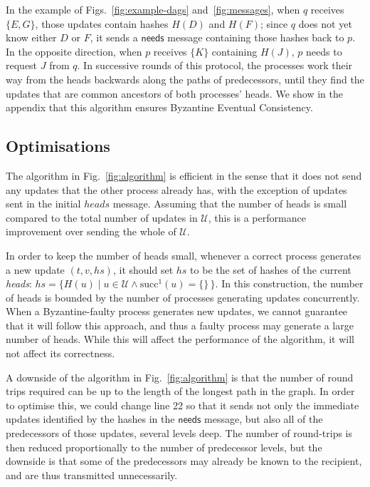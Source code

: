 \documentclass[manuscript,anonymous]{acmart}
\begin{document}
In the example of Figs.~\ref{fig:example-dags} and~\ref{fig:messages}, when $q$ receives $\{E, G\}$, those updates contain hashes $H(D)$ and $H(F)$; since $q$ does not yet know either $D$ or $F$, it sends a $\mathsf{needs}$ message containing those hashes back to $p$.
In the opposite direction, when $p$ receives $\{K\}$ containing $H(J)$, $p$ needs to request $J$ from $q$.
In successive rounds of this protocol, the processes work their way from the heads backwards along the paths of predecessors, until they find the updates that are common ancestors of both processes' heads.
We show in the appendix that this algorithm ensures Byzantine Eventual Consistency.

\subsection{Optimisations}\label{sec:optimisations}

The algorithm in Fig.~\ref{fig:algorithm} is efficient in the sense that it does not send any updates that the other process already has, with the exception of updates sent in the initial $\mathit{heads}$ message.
Assuming that the number of heads is small compared to the total number of updates in $\mathcal{U}$, this is a performance improvement over sending the whole of $\mathcal{U}$.

In order to keep the number of heads small, whenever a correct process generates a new update $(t, v, \mathit{hs})$, it should set $\mathit{hs}$ to be the set of hashes of the current \emph{heads}:
$\mathit{hs} = \{H(u) \mid u \in \mathcal{U} \wedge \mathrm{succ}^1(u) = \{\}\,\}$.
In this construction, the number of heads is bounded by the number of processes generating updates concurrently.
When a Byzantine-faulty process generates new updates, we cannot guarantee that it will follow this approach, and thus a faulty process may generate a large number of heads.
While this will affect the performance of the algorithm, it will not affect its correctness.

A downside of the algorithm in Fig.~\ref{fig:algorithm} is that the number of round trips required can be up to the length of the longest path in the graph.
In order to optimise this, we could change line 22 so that it sends not only the immediate updates identified by the hashes in the $\mathsf{needs}$ message, but also all of the predecessors of those updates, several levels deep.
The number of round-trips is then reduced proportionally to the number of predecessor levels, but the downside is that some of the predecessors may already be known to the recipient, and are thus transmitted unnecessarily.
\end{document}
